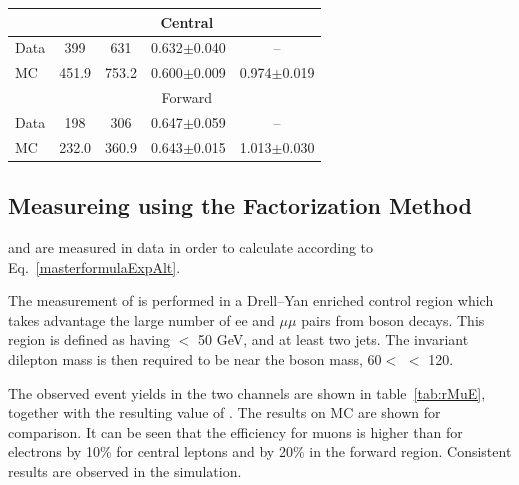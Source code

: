 \begin{table}[hbt]
\begin{tabular}{l|c|c|c|c}
    \hline
    & \multicolumn{4}{c}{Central} \\
    \hline
    Data & 399 & 631 & 0.632$\pm$0.040 & -- \\
    MC & 451.9 & 753.2 & 0.600$\pm$0.009 & 0.974$\pm$0.019\\
    \hline 
    & \multicolumn{4}{c}{Forward} \\
    \hline
    Data & 198 & 306 & 0.647$\pm$0.059 & -- \\
    MC & 232.0 & 360.9 & 0.643$\pm$0.015 & 1.013$\pm$0.030\\
  \end{tabular}  
\end{table}

\subsection{Measureing \texorpdfstring{\rsfof}{Rsfof} using the Factorization Method}
\label{ssec:rsfoffactorization}
\rmue and \rt are measured in data in order to calculate \rsfof according to Eq.~\ref{masterformulaExpAlt}.

The measurement of \rmue is performed in a Drell--Yan enriched control region
which takes advantage the large number of ee and $\mu\mu$ pairs from \Z boson decays.
This region is defined as having \MET $<$ 50 GeV, and at least two jets.
The invariant dilepton mass is then required to be near the \Z boson mass,
60\GeV $<$ \mll $<$ 120\GeV.

The observed event yields in the two channels are shown in table~\ref{tab:rMuE},
together with the resulting value of \rmue.
The results on MC are shown for comparison.
It can be seen that the efficiency for muons is higher than for electrons by 10\%
for central leptons and by 20\% in the forward region.
Consistent results are observed in the simulation.

